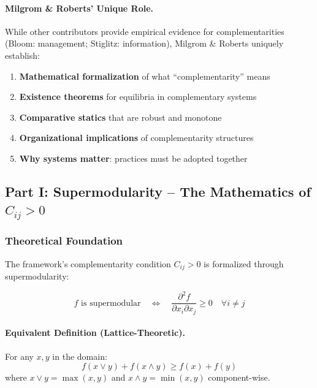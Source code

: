 \paragraph{Milgrom \& Roberts' Unique Role.}
While other contributors provide empirical evidence for complementarities (Bloom: 
management; Stiglitz: information), Milgrom \& Roberts uniquely establish:
\begin{enumerate}
    \item \textbf{Mathematical formalization} of what ``complementarity'' means
    \item \textbf{Existence theorems} for equilibria in complementary systems
    \item \textbf{Comparative statics} that are robust and monotone
    \item \textbf{Organizational implications} of complementarity structures
    \item \textbf{Why systems matter}: practices must be adopted together
\end{enumerate}

\subsection{Part I: Supermodularity – The Mathematics of $C_{ij} > 0$}

\subsubsection{Theoretical Foundation}

The framework's complementarity condition $C_{ij} > 0$ is formalized through 
supermodularity:

\begin{equation}
\boxed{
f \text{ is supermodular} \quad \Leftrightarrow \quad 
\frac{\partial^2 f}{\partial x_i \partial x_j} \geq 0 \quad \forall i \neq j
}
\label{eq:mr-supermodular}
\end{equation}

\paragraph{Equivalent Definition (Lattice-Theoretic).}
For any $x, y$ in the domain:
\begin{equation}
f(x \vee y) + f(x \wedge y) \geq f(x) + f(y)
\end{equation}
where $x \vee y = \max(x,y)$ and $x \wedge y = \min(x,y)$ component-wise.

